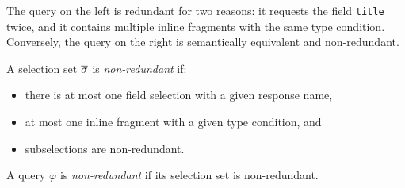 \bigskip

\noindent The query on the left is redundant for two reasons: it requests the field
\texttt{title} twice, and it contains multiple inline fragments with
the same type condition. %
Conversely, the query on the right is semantically equivalent and non-redundant. %

\begin{definition}
A \gql selection set $\overline{\sigma}$ is \textit{non-redundant} if:
\begin{itemize}
    \item there is at most one field selection with a given response name, 
    
    \item at most one inline fragment with a given type condition, and
    
    \item subselections are non-redundant.
    \end{itemize}

\noindent    A \gql query $\varphi$ is \textit{non-redundant} if its selection set is non-redundant.

\end{definition}




